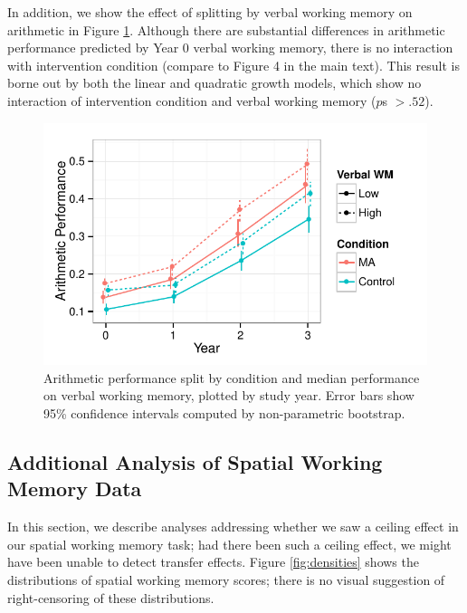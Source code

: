 \documentclass[11pt]{article}
\begin{document}
In addition, we show the effect of splitting by verbal working memory on arithmetic in Figure \ref{fig:arithvwm}. Although there are substantial differences in arithmetic performance predicted by Year 0 verbal working memory, there is no interaction with intervention condition (compare to Figure 4 in the main text). This result is borne out by both the linear and quadratic growth models, which show no interaction of intervention condition and verbal working memory ($p$s $> .52$).

\begin{figure}[H]
\begin{center}
\includegraphics[width=4.5in]{figures/arith_by_vwm.pdf}
\end{center}
\caption{Arithmetic performance split by condition and median performance on verbal working memory, plotted by study year. Error bars show 95\% confidence intervals computed by non-parametric bootstrap.}
\label{fig:arithvwm}
\end{figure}

\subsection{Additional Analysis of Spatial Working Memory Data}

In this section, we describe analyses addressing whether we saw a ceiling effect in our spatial working memory task; had there been such a ceiling effect, we might have been unable to detect transfer effects. Figure \ref{fig:densities} shows the distributions of spatial working memory scores; there is no visual suggestion of right-censoring of these distributions.
\end{document}
